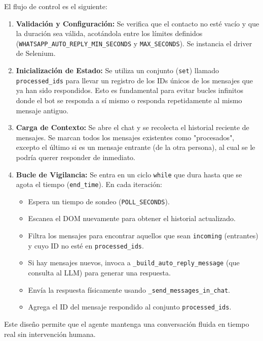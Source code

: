 \documentclass[letterpaper,12pt]{article}
\begin{document}
El flujo de control es el siguiente:
\begin{enumerate}
    \item \textbf{Validación y Configuración:} Se verifica que el contacto no esté vacío y que la duración sea válida, acotándola entre los límites definidos (\texttt{WHATSAPP\_AUTO\_REPLY\_MIN\_SECONDS} y \texttt{MAX\_SECONDS}). Se instancia el driver de Selenium.
    \item \textbf{Inicialización de Estado:} Se utiliza un conjunto (\texttt{set}) llamado \texttt{processed\_ids} para llevar un registro de los IDs únicos de los mensajes que ya han sido respondidos. Esto es fundamental para evitar bucles infinitos donde el bot se responda a sí mismo o responda repetidamente al mismo mensaje antiguo.
    \item \textbf{Carga de Contexto:} Se abre el chat y se recolecta el historial reciente de mensajes. Se marcan todos los mensajes existentes como "procesados", excepto el último si es un mensaje entrante (de la otra persona), al cual se le podría querer responder de inmediato.
    \item \textbf{Bucle de Vigilancia:} Se entra en un ciclo \texttt{while} que dura hasta que se agota el tiempo (\texttt{end\_time}). En cada iteración:
    \begin{itemize}
        \item Espera un tiempo de sondeo (\texttt{POLL\_SECONDS}).
        \item Escanea el DOM nuevamente para obtener el historial actualizado.
        \item Filtra los mensajes para encontrar aquellos que sean \texttt{incoming} (entrantes) y cuyo ID no esté en \texttt{processed\_ids}.
        \item Si hay mensajes nuevos, invoca a \texttt{\_build\_auto\_reply\_message} (que consulta al LLM) para generar una respuesta.
        \item Envía la respuesta físicamente usando \texttt{\_send\_messages\_in\_chat}.
        \item Agrega el ID del mensaje respondido al conjunto \texttt{processed\_ids}.
    \end{itemize}
\end{enumerate}

Este diseño permite que el agente mantenga una conversación fluida en tiempo real sin intervención humana.
\end{document}
